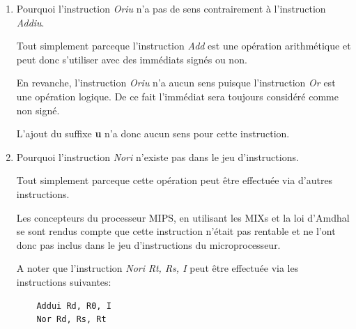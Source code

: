 \begin{enumerate}
\begin{correction}
      Ainsi l'adresse suivante est calcul\'ee de la mani\`ere suivante:

      \begin{verbatim}
	instruction address = branchment instruction address + 4 +
                      immediate << 2
      \end{verbatim}

      ce qui est \'equivalent \`a:

      \begin{verbatim}
	instruction address = current instruction address + immediate << 2
      \end{verbatim}

    \end{correction}
  \item
    Pourquoi l'instruction \textit{Oriu} n'a pas de sens contrairement
    \`a l'instruction \textit{Addiu}.

    \begin{correction}

      Tout simplement parceque l'instruction \textit{Add} est une
      op\'eration arithm\'etique et peut donc s'utiliser avec des
      imm\'ediats sign\'es ou non.

      En revanche, l'instruction \textit{Oriu} n'a aucun sens puisque
      l'instruction \textit{Or} est une op\'eration logique. De ce fait
      l'imm\'ediat sera toujours consid\'er\'e comme non sign\'e.

      L'ajout du suffixe \textbf{u} n'a donc aucun sens pour cette instruction.

    \end{correction}
  \item
    Pourquoi l'instruction \textit{Nori} n'existe pas dans le jeu
    d'instructions.

    \begin{correction}

      Tout simplement parceque cette op\'eration peut \^etre effectu\'ee
      via d'autres instructions.

      Les concepteurs du processeur MIPS, en utilisant les MIXs et la
      loi d'Amdhal se sont rendus compte que cette instruction n'\'etait
      pas rentable et ne l'ont donc pas inclus dans le jeu d'instructions
      du microprocesseur.

      A noter que l'instruction \textit{Nori Rt, Rs, I} peut
      \^etre effectu\'ee via les instructions suivantes:

      \begin{verbatim}
	Addui Rd, R0, I
	Nor Rd, Rs, Rt
      \end{verbatim}


\end{correction}
\end{enumerate}

